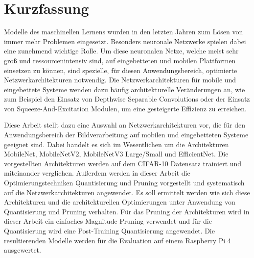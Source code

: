 
\cleardoublepage



\section*{Kurzfassung}
Modelle des maschinellen Lernens wurden in den letzten Jahren zum Lösen von immer mehr Problemen eingesetzt. Besonders neuronale Netzwerke spielen dabei eine zunehmend wichtige Rolle. Um diese neuronalen Netze, welche meist sehr groß und ressourcenintensiv sind, auf eingebetteten und mobilen Plattformen einsetzen zu können, sind spezielle, für diesen Anwendungsbereich, optimierte Netzwerkarchitekturen notwendig. Die Netzwerkarchitekturen für mobile und eingebettete Systeme wenden dazu häufig architekturelle Veränderungen an, wie zum Beispiel den Einsatz von Depthwise Separable Convolutions oder der Einsatz von Squeeze-And-Excitation Modulen, um eine gesteigerte Effizienz zu erreichen.

Diese Arbeit stellt dazu eine Auswahl an Netzwerkarchitekturen vor, die für den Anwendungsbereich der Bildverarbeitung auf mobilen und eingebetteten Systeme geeignet sind. Dabei handelt es sich im Wesentlichen um die Architekturen MobileNet, MobileNetV2, MobileNetV3 Large/Small und EfficientNet. Die vorgestellten Architekturen werden auf dem CIFAR-10 Datensatz trainiert und miteinander verglichen. Außerdem werden in dieser Arbeit die Optimierungstechniken Quantisierung und Pruning vorgestellt und systematisch auf die Netzwerkarchitekturen angewendet. Es soll ermittelt werden wie sich diese Architekturen und die architekturellen Optimierungen unter Anwendung von Quantisierung und Pruning verhalten. Für das Pruning der Architekturen wird in dieser Arbeit ein einfaches Magnitude Pruning verwendet und für die Quantisierung wird eine Post-Training Quantisierung angewendet. Die resultierenden Modelle werden für die Evaluation auf einem Raspberry Pi 4 ausgewertet.

